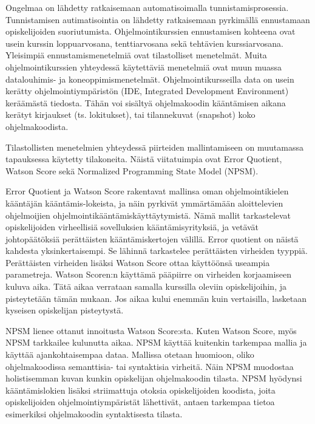 \documentclass[finnish,twoside,openright]{HYgraduMLDS}
\begin{document}
Ongelmaa on lähdetty ratkaisemaan automatisoimalla tunnistamisprosessia. Tunnistamisen autimatisointia on lähdetty ratkaisemaan pyrkimällä ennustamaan opiskelijoiden suoriutumista. Ohjelmointikurssien ennustamisen kohteena ovat usein kurssin loppuarvosana, tenttiarvosana sekä tehtävien kurssiarvosana. Yleisimpiä ennustamismenetelmiä ovat tilastolliset menetelmät\cite{hellas2018predicting}. Muita ohjelmointikurssien yhteydessä käytettäviä menetelmiä ovat muun muassa datalouhimis- ja koneoppimismenetelmät. Ohjelmointikursseilla data on usein kerätty ohjelmointiympäristön (IDE, Integrated Development Environment) keräämästä tiedosta. Tähän voi sisältyä ohjelmakoodin kääntämisen aikana kerätyt kirjaukset (ts. lokitukset), tai tilannekuvat (snapshot) koko ohjelmakoodista\cite{watson2013predicting, jadud2006methods, lagus2018transfer}.

Tilastollisten menetelmien yhteydessä piirteiden mallintamiseen on muutamassa tapauksessa käytetty tilakoneita. Näistä viitatuimpia ovat Error Quotient\cite{jadud2006methods}, Watson Score\cite{watson2013predicting} sekä Normalized Programming State Model (NPSM)\cite{carter2015normalized}. 

Error Quotient ja Watson Score rakentavat mallinsa oman ohjelmointikielen kääntäjän kääntämis-lokeista, ja näin pyrkivät ymmärtämään aloittelevien ohjelmoijien ohjelmointikääntämiskäyttäytymistä. Nämä mallit tarkastelevat opiskelijoiden virheellisiä sovelluksien kääntämisyrityksiä, ja vetävät johtopäätöksiä perättäisten kääntämiskertojen välillä. Error quotient on näistä kahdesta yksinkertaisempi. Se lähinnä tarkastelee perättäisten virheiden tyyppiä. Perättäisten virheiden lisäksi Watson Score ottaa käyttöönsä useampia parametreja. Watson Scoren:n käyttämä pääpiirre on virheiden korjaamiseen kuluva aika. Tätä aikaa verrataan samalla kurssilla oleviin opiskelijoihin, ja pisteytetään tämän mukaan. Jos aikaa kului enemmän kuin vertaisilla, lasketaan kyseisen opiskelijan pisteytystä.

NPSM lienee ottanut innoitusta Watson Score:sta. Kuten Watson Score, myös NPSM tarkkailee kulunutta aikaa. NPSM käyttää kuitenkin tarkempaa mallia ja käyttää ajankohtaisempaa dataa. Mallissa otetaan huomioon, oliko ohjelmakoodissa semanttisia- tai syntaktisia virheitä. Näin NPSM muodostaa holistisemman kuvan kunkin opiskelijan ohjelmakoodin tilasta. NPSM hyödynsi kääntämislokien lisäksi striimattuja otoksia opiskelijoiden koodista, joita opiskelijoiden ohjelmointiympäristät lähettivät, antaen tarkempaa tietoa esimerkiksi ohjelmakoodin syntaktisesta tilasta. 
\end{document}

